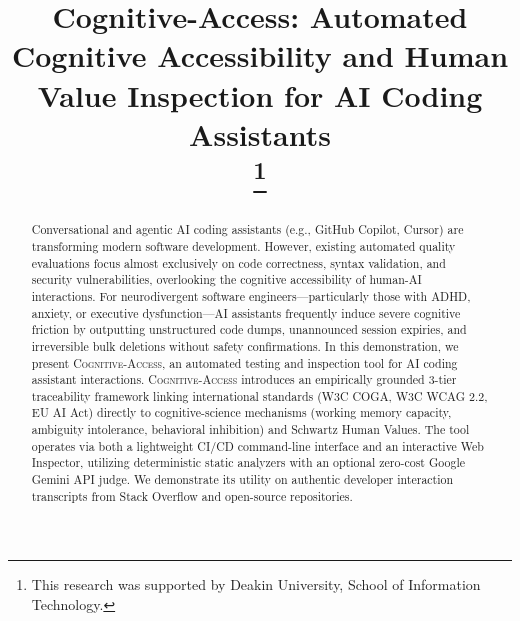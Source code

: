 \documentclass[conference]{IEEEtran}
\begin{document}
\title{Cognitive-Access: Automated Cognitive Accessibility and Human Value Inspection for AI Coding Assistants\\
\thanks{This research was supported by Deakin University, School of Information Technology.}
}

\author{
\and
{}
}

\maketitle

\begin{abstract}
Conversational and agentic AI coding assistants (e.g., GitHub Copilot, Cursor) are transforming modern software development. However, existing automated quality evaluations focus almost exclusively on code correctness, syntax validation, and security vulnerabilities, overlooking the cognitive accessibility of human-AI interactions. For neurodivergent software engineers—particularly those with ADHD, anxiety, or executive dysfunction—AI assistants frequently induce severe cognitive friction by outputting unstructured code dumps, unannounced session expiries, and irreversible bulk deletions without safety confirmations. In this demonstration, we present \textsc{Cognitive-Access}, an automated testing and inspection tool for AI coding assistant interactions. \textsc{Cognitive-Access} introduces an empirically grounded 3-tier traceability framework linking international standards (W3C COGA, W3C WCAG 2.2, EU AI Act) directly to cognitive-science mechanisms (working memory capacity, ambiguity intolerance, behavioral inhibition) and Schwartz Human Values. The tool operates via both a lightweight CI/CD command-line interface and an interactive Web Inspector, utilizing deterministic static analyzers with an optional zero-cost Google Gemini API judge. We demonstrate its utility on authentic developer interaction transcripts from Stack Overflow and open-source repositories.
\end{abstract}
\end{document}
